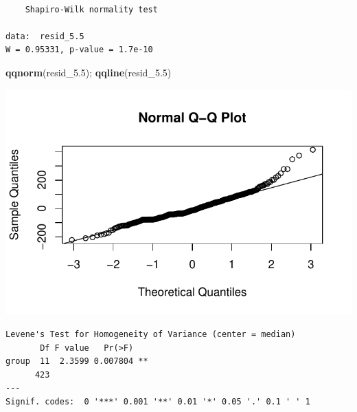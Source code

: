 \documentclass[
  british,
  10pt,
]{article}
\newenvironment{Shaded}{\begin{snugshade}}{\end{snugshade}}
\newcommand{\AttributeTok}[1]{\textcolor[rgb]{0.13,0.29,0.53}{#1}}
\newcommand{\CommentTok}[1]{\textcolor[rgb]{0.56,0.35,0.01}{\textit{#1}}}
\newcommand{\FloatTok}[1]{\textcolor[rgb]{0.00,0.00,0.81}{#1}}
\newcommand{\FunctionTok}[1]{\textcolor[rgb]{0.13,0.29,0.53}{\textbf{#1}}}
\newcommand{\NormalTok}[1]{#1}
\newcommand{\OtherTok}[1]{\textcolor[rgb]{0.56,0.35,0.01}{#1}}
\newcommand{\SpecialCharTok}[1]{\textcolor[rgb]{0.81,0.36,0.00}{\textbf{#1}}}
\begin{document}
\begin{verbatim}

    Shapiro-Wilk normality test

data:  resid_5.5
W = 0.95331, p-value = 1.7e-10
\end{verbatim}

\begin{Shaded}
\begin{Highlighting}[]
\FunctionTok{qqnorm}\NormalTok{(resid\_5}\FloatTok{.5}\NormalTok{); }\FunctionTok{qqline}\NormalTok{(resid\_5}\FloatTok{.5}\NormalTok{)}
\end{Highlighting}
\end{Shaded}

\begin{center}
\includegraphics[width=0.6\linewidth,height=\textheight,keepaspectratio]{BCB744_Biostats_Prac_Exam_2025_files/figure-pdf/chunk21-1.pdf}
\end{center}

\begin{Shaded}
\end{Shaded}

\begin{verbatim}
Levene's Test for Homogeneity of Variance (center = median)
       Df F value   Pr(>F)   
group  11  2.3599 0.007804 **
      423                    
---
Signif. codes:  0 '***' 0.001 '**' 0.01 '*' 0.05 '.' 0.1 ' ' 1
\end{verbatim}
\end{document}
